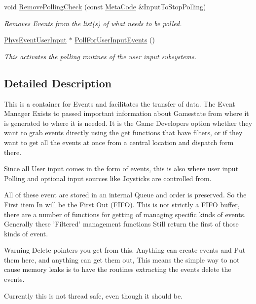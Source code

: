 \begin{DoxyCompactItemize}
void \hyperlink{classPhysEventManager_af81bf9a5f081f44a6cd91fdd19d4a42a}{RemovePollingCheck} (const \hyperlink{classMetaCode}{MetaCode} \&InputToStopPolling)
\begin{DoxyCompactList}\small\item\em Removes Events from the list(s) of what needs to be polled. \item\end{DoxyCompactList}\item 
\hyperlink{classPhysEventUserInput}{PhysEventUserInput} $\ast$ \hyperlink{classPhysEventManager_ac66ebe495e2a77d06803291711528db2}{PollForUserInputEvents} ()
\begin{DoxyCompactList}\small\item\em This activates the polling routines of the user input subsystems. \item\end{DoxyCompactList}\end{DoxyCompactItemize}


\subsection{Detailed Description}
This is a container for Events and facilitates the transfer of data. The Event Manager Exists to passed important information about Gamestate from where it is generated to where it is needed. It is the Game Developers option whether they want to grab events directly using the get functions that have filters, or if they want to get all the events at once from a central location and dispatch form there. \par
 Since all User input comes in the form of events, this is also where user input Polling and optional input sources like Joysticks are controlled from. \par
 All of these event are stored in an internal Queue and order is preserved. So the First item In will be the First Out (FIFO). This is not strictly a FIFO buffer, there are a number of functions for getting of managing specific kinds of events. Generally these 'Filtered' management functions Still return the first of those kinds of event. \begin{DoxyWarning}{Warning}
Delete pointers you get from this. Anything can create events and Put them here, and anything can get them out, This means the simple way to not cause memory leaks is to have the routines extracting the events delete the events. 

Currently this is not thread safe, even though it should be. 
\end{DoxyWarning}


